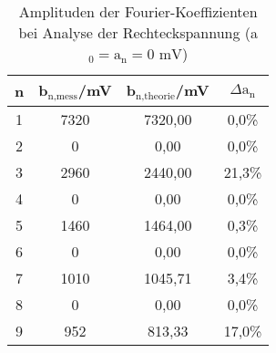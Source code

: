 \begin{table}[h]
	\begin{center}
		\begin{tabular}{cccc}
			n&b$_\text{n,mess}$/mV & b$_\text{n,theorie}$/mV & $\Delta \text{a}_\text{n}$\\ \hline
			1&7320&7320,00&0,0\%\\
			2&0&0,00&0,0\%\\
			3&2960&2440,00&21,3\%\\
			4&0&0,00&0,0\%\\
			5&1460&1464,00&0,3\%\\
			6&0&0,00&0,0\%\\
			7&1010&1045,71&3,4\%\\
			8&0&0,00&0,0\%\\
			9&952&813,33&17,0\%
		\end{tabular}
		\caption{Amplituden der Fourier-Koeffizienten bei Analyse der Rechteckspannung (a$_\text{0}=\text{a}_\text{n}=0\text{ mV}$)}
		\label{tabfar}
	\end{center}
\end{table}